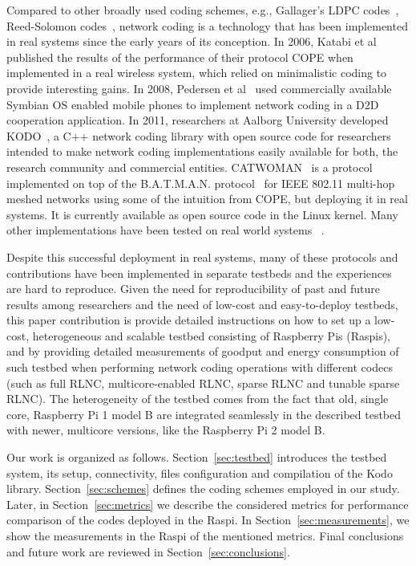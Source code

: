 Compared to other broadly used coding schemes, e.g., Gallager's LDPC
codes~\cite{gallager1962low}, Reed-Solomon
codes~\cite{reed1960polynomial}, network coding is a technology that
has been implemented in real systems since the early years of its
conception. In 2006, Katabi et al~\cite{katabi2006practical} published
the results of the performance of their protocol COPE when implemented
in a real wireless system, which relied on minimalistic coding to
provide interesting gains. In 2008, Pedersen et
al~\cite{pedersen2008implementation} used commercially available
Symbian OS enabled mobile phones to implement network coding in a
\ac{D2D} cooperation application. In 2011, researchers at Aalborg
University developed KODO~\cite{kodo2011pedersen}, a C++ network
coding library with open source code for researchers intended to make
network coding implementations easily available for both, the research
community and commercial entities.
CATWOMAN~\cite{hundeboll2012catwoman} is a protocol implemented on top
of the B.A.T.M.A.N. protocol~\cite{johnson2008simple} for IEEE 802.11
multi-hop meshed networks using some of the intuition from COPE, but
deploying it in real systems. It is currently available as open source
code in the Linux kernel. Many other implementations have been tested
on real world systems~
\cite{pahlevani2013playncool,katti2008xors,krigslund2013core,paramanathan2013leanandmean}.

Despite this successful deployment in real systems, many of these
protocols and contributions have been implemented in separate testbeds
and the experiences are hard to reproduce.  Given the need for
reproducibility of past and future results among researchers and the
need of low-cost and easy-to-deploy testbeds, this paper contribution
is provide detailed instructions on how to set up a low-cost,
heterogeneous and scalable testbed consisting of Raspberry Pis
(Raspis), and by providing detailed measurements of goodput and energy
consumption of such testbed when performing network coding operations
with different codecs (such as full RLNC, multicore-enabled RLNC,
sparse RLNC and tunable sparse RLNC). The heterogeneity of the testbed
comes from the fact that old, single core, Raspberry Pi 1 model B are
integrated seamlessly in the described testbed with newer, multicore
versions, like the Raspberry Pi 2 model B.

Our work is organized as follows. Section~\ref{sec:testbed} introduces the
testbed system, its setup, connectivity, files configuration and compilation of
the Kodo library. Section~\ref{sec:schemes} defines the coding schemes employed
in our study. Later, in Section~\ref{sec:metrics} we describe the considered
metrics for performance comparison of the codes deployed in the \ac{Raspi}. In
Section~\ref{sec:measurements}, we show the measurements in the \ac{Raspi} of
the mentioned metrics. Final conclusions and future work are reviewed in
Section~\ref{sec:conclusions}.


